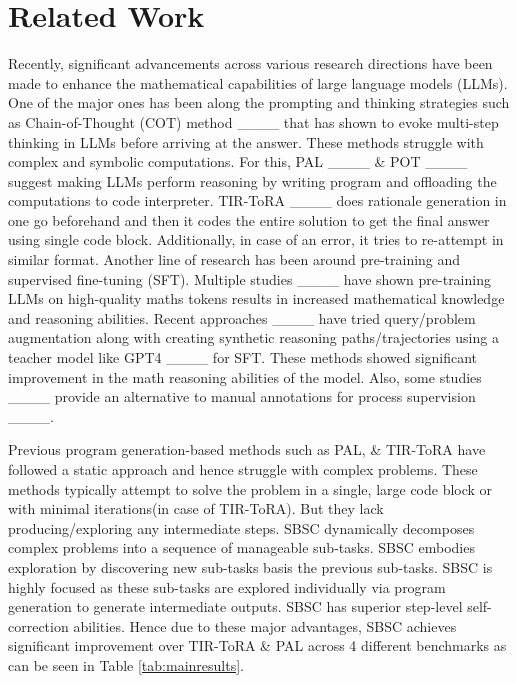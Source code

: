 \section{Related Work}
\label{related_work}

Recently, significant advancements across various research directions have been made to enhance the mathematical capabilities of large language models (LLMs). One of the major ones has been along the prompting and thinking strategies such as Chain-of-Thought (COT) method ____ that has shown to evoke multi-step thinking in LLMs before arriving at the answer. These methods struggle with complex and symbolic computations. For this, PAL ____ \& POT ____ suggest making LLMs perform reasoning by writing program and offloading the computations to code interpreter. TIR-ToRA ____ does rationale generation in one go beforehand and then it codes the entire solution to get the final answer using single code block. Additionally, in case of an error, it tries to re-attempt in similar format. Another line of research has been around pre-training and supervised fine-tuning (SFT). Multiple studies ____ have shown pre-training LLMs on high-quality maths tokens results in increased mathematical knowledge and reasoning abilities. Recent approaches ____ have tried query/problem augmentation along with creating synthetic reasoning paths/trajectories using a teacher model like GPT4 ____ for SFT. These methods showed significant improvement in the math reasoning abilities of the model.  Also, some studies ____ provide an alternative to manual annotations for process supervision ____.
      
Previous program generation-based methods such as PAL, \& TIR-ToRA have followed a static approach and hence struggle with complex problems. These methods typically attempt to solve the problem in a single, large code block or with minimal iterations(in case of TIR-ToRA). But they lack producing/exploring any intermediate steps. 
SBSC dynamically decomposes complex problems into a sequence of manageable sub-tasks. SBSC embodies exploration by discovering new sub-tasks basis the previous sub-tasks. SBSC is highly focused as these sub-tasks are explored individually via program generation to generate intermediate outputs. SBSC has superior step-level self-correction abilities. Hence due to these major advantages, SBSC achieves significant improvement over TIR-ToRA \& PAL across 4 different benchmarks as can be seen in Table \ref{tab:mainresults}.